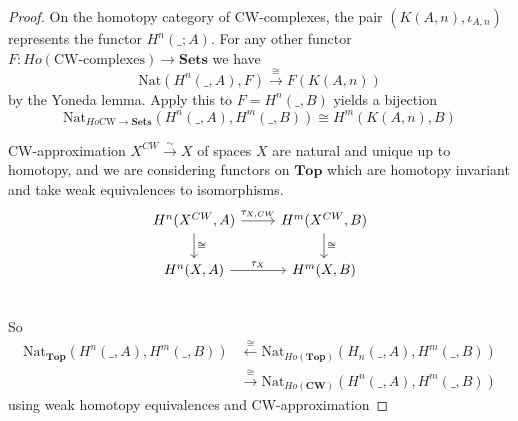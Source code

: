 \documentclass[language=english]{TemplateLecture}
\begin{document}
\begin{proof}
    On the homotopy category of CW-complexes, the pair \((K(A,n), \iota_{A,n})\) represents the functor \(H^n(\_; A)\). For any other functor \(F\colon Ho(\text{CW-complexes})\to \mathbf{Sets}\) we have
    \[\mathrm{Nat}(H^n(\_, A), F) \xrightarrow{\cong} F(K(A,n))\]
    by the Yoneda lemma. Apply this to \(F = H^n(\_, B)\) yields a bijection
    \[\mathrm{Nat}_{Ho\text{CW}\to \mathbf{Sets}}(H^n(\_, A), H^m(\_, B))\cong H^m(K(A,n), B)\]

    CW-approximation \(X^{CW}\xrightarrow{\sim} X\) of spaces \(X\) are natural and unique up to homotopy, and we are considering functors on \(\mathbf{Top}\) which are homotopy invariant and take weak equivalences to isomorphisms.
    \[\begin{tikzcd}
        H^n(X^{CW}, A) \ar[r, "\tau_{X, CW}"]\ar[d, "\cong"] & H^m(X^{CW}, B) \ar[d, "\cong"] \\
        H^n(X,A) \ar[r, "\tau_X"] & H^m(X,B) \\
    \end{tikzcd}\]
    So
    \[\begin{split}
        \mathrm{Nat}_{\mathbf{Top}}(H^n(\_,A), H^m(\_, B)) &\xleftarrow{\cong} \mathrm{Nat}_{Ho(\mathbf{Top})}(H_n(\_,A), H^m(\_,B)) \\
        &\xrightarrow{\cong} \mathrm{Nat}_{Ho(\mathbf{CW})}(H^n(\_,A), H^m(\_, B))
    \end{split}\]
    using weak homotopy equivalences and CW-approximation
\end{proof}
\end{document}
